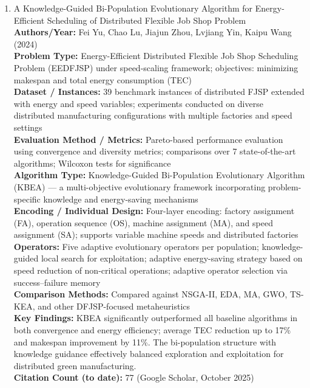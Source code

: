 \documentclass[a4paper,12pt]{article}
\begin{document}
\begin{enumerate}[leftmargin=2em, labelwidth=1em, labelsep=0.5em, itemsep=1ex]
  \item A Knowledge-Guided Bi-Population Evolutionary Algorithm for Energy-Efficient Scheduling of Distributed Flexible Job Shop Problem \\
    \textbf{Authors/Year:} Fei Yu, Chao Lu, Jiajun Zhou, Lvjiang Yin, Kaipu Wang (2024) \\  
    \textbf{Problem Type:} Energy-Efficient Distributed Flexible Job Shop Scheduling Problem (EEDFJSP) under speed-scaling framework; objectives: minimizing makespan and total energy consumption (TEC) \\  
    \textbf{Dataset / Instances:} 39 benchmark instances of distributed FJSP extended with energy and speed variables; experiments conducted on diverse distributed manufacturing configurations with multiple factories and speed settings \\  
    \textbf{Evaluation Method / Metrics:} Pareto-based performance evaluation using convergence and diversity metrics; comparisons over 7 state-of-the-art algorithms; Wilcoxon tests for significance \\  
    \textbf{Algorithm Type:} Knowledge-Guided Bi-Population Evolutionary Algorithm (KBEA) — a multi-objective evolutionary framework incorporating problem-specific knowledge and energy-saving mechanisms \\  
    \textbf{Encoding / Individual Design:} Four-layer encoding: factory assignment (FA), operation sequence (OS), machine assignment (MA), and speed assignment (SA); supports variable machine speeds and distributed factories \\  
    \textbf{Operators:} Five adaptive evolutionary operators per population; knowledge-guided local search for exploitation; adaptive energy-saving strategy based on speed reduction of non-critical operations; adaptive operator selection via success–failure memory \\  
    \textbf{Comparison Methods:} Compared against NSGA-II, EDA, MA, GWO, TS-KEA, and other DFJSP-focused metaheuristics \\  
    \textbf{Key Findings:} KBEA significantly outperformed all baseline algorithms in both convergence and energy efficiency; average TEC reduction up to 17\% and makespan improvement by 11\%. The bi-population structure with knowledge guidance effectively balanced exploration and exploitation for distributed green manufacturing. \\  
    \textbf{Citation Count (to date):} 77 (Google Scholar, October 2025) \\[2ex]
  


\end{enumerate}
\end{document}
